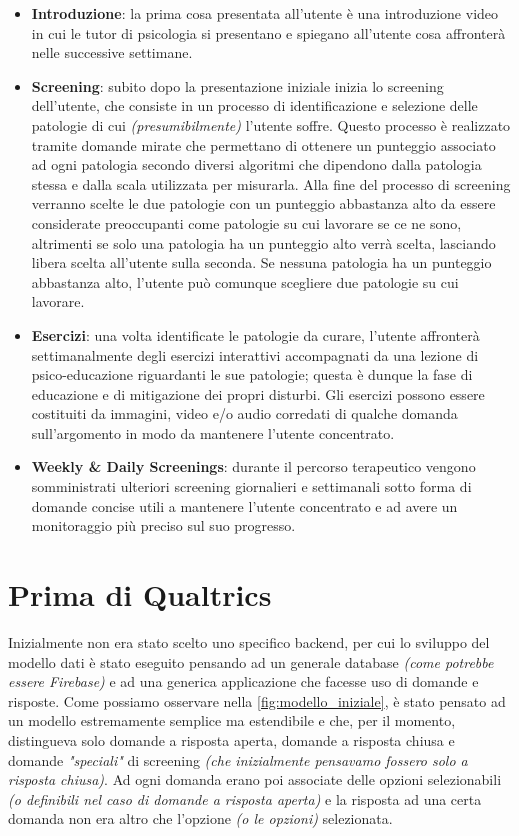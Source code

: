 \begin{itemize}
\item \textbf{Introduzione}: la prima cosa presentata all'utente è una introduzione video in cui le tutor di psicologia si presentano e spiegano all'utente cosa affronterà nelle successive settimane.
\item \textbf{Screening}: subito dopo la presentazione iniziale inizia lo screening dell'utente, che consiste in un processo di identificazione e selezione delle patologie di cui \textit{(presumibilmente)} l'utente soffre. Questo processo è realizzato tramite domande mirate che permettano di ottenere un punteggio associato ad ogni patologia secondo diversi algoritmi che dipendono dalla patologia stessa e dalla scala utilizzata per misurarla. Alla fine del processo di screening verranno scelte le due patologie con un punteggio abbastanza alto da essere considerate preoccupanti come patologie su cui lavorare se ce ne sono, altrimenti se solo una patologia ha un punteggio alto verrà scelta, lasciando libera scelta all'utente sulla seconda. Se nessuna patologia ha un punteggio abbastanza alto, l'utente può comunque scegliere due patologie su cui lavorare.
\item \textbf{Esercizi}: una volta identificate le patologie da curare, l'utente affronterà settimanalmente degli esercizi interattivi accompagnati da una lezione di psico-educazione riguardanti le sue patologie; questa è dunque la fase di educazione e di mitigazione dei propri disturbi. Gli esercizi possono essere costituiti da immagini, video e/o audio corredati di qualche domanda sull'argomento in modo da mantenere l'utente concentrato.
\item \textbf{Weekly \& Daily Screenings}: durante il percorso terapeutico vengono somministrati ulteriori screening giornalieri e settimanali sotto forma di domande concise utili a mantenere l'utente concentrato e ad avere un monitoraggio più preciso sul suo progresso.
\end{itemize}

\newpage

\section{Prima di Qualtrics}
Inizialmente non era stato scelto uno specifico backend, per cui lo sviluppo del modello dati è stato eseguito pensando ad un generale database \textit{(come potrebbe essere Firebase)} e ad una generica applicazione che facesse uso di domande e risposte. Come possiamo osservare nella \autoref{fig:modello_iniziale}, è stato pensato ad un modello estremamente semplice ma estendibile e che, per il momento, distingueva solo domande a risposta aperta, domande a risposta chiusa e domande \textit{"speciali"} di screening \textit{(che inizialmente pensavamo fossero solo a risposta chiusa)}.
Ad ogni domanda erano poi associate delle opzioni selezionabili \textit{(o definibili nel caso di domande a risposta aperta)} e la risposta ad una certa domanda non era altro che l'opzione \textit{(o le opzioni)} selezionata.


